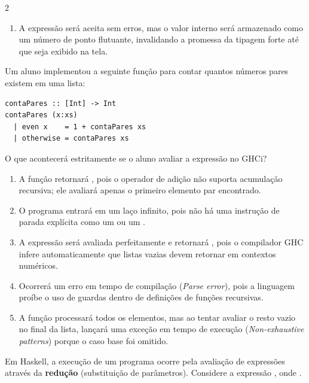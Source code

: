 \documentclass[a4paper,10pt,brazil]{article}
\begin{document}
\begin{multicols}{2}
\begin{enumerate}
  \item A expressão será aceita sem erros, mas o valor interno será armazenado como um número de ponto flutuante, invalidando a promessa da tipagem forte até que seja exibido na tela.


\end{enumerate}

Um aluno implementou a seguinte função para contar quantos números pares existem em uma lista:

\begin{verbatim}
contaPares :: [Int] -> Int
contaPares (x:xs)
  | even x    = 1 + contaPares xs
  | otherwise = contaPares xs
\end{verbatim}

O que acontecerá estritamente se o aluno avaliar a expressão  no GHCi?

\begin{enumerate}
  \item A função retornará , pois o operador de adição não suporta acumulação recursiva; ele avaliará apenas o primeiro elemento par encontrado.

  \item O programa entrará em um laço infinito, pois não há uma instrução de parada explícita como um  ou um .

  \item A expressão será avaliada perfeitamente e retornará , pois o compilador GHC infere automaticamente que listas vazias devem retornar  em contextos numéricos.

  \item Ocorrerá um erro em tempo de compilação (\emph{Parse error}), pois a linguagem proíbe o uso de guardas dentro de definições de funções recursivas.

  \item A função processará todos os elementos, mas ao tentar avaliar o resto vazio no final da lista, lançará uma exceção em tempo de execução (\emph{Non-exhaustive patterns}) porque o caso base  foi omitido.


\end{enumerate}

Em Haskell, a execução de um programa ocorre pela avaliação de expressões através da \textbf{redução} (substituição de parâmetros). Considere a expressão , onde . 


\end{multicols}
\end{document}
